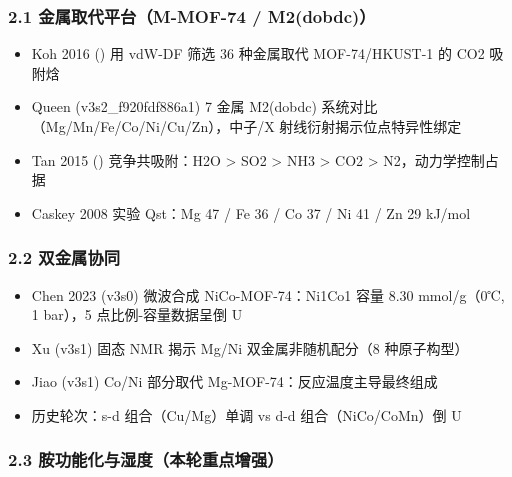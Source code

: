 \documentclass[12pt,a4paper]{ctexart}
\providecommand{\tightlist}{%
  \setlength{\itemsep}{0pt}\setlength{\parskip}{0pt}}
\begin{document}
\subsubsection{2.1 金属取代平台（M-MOF-74 / M2(dobdc)）}\label{ux91d1ux5c5eux53d6ux4ee3ux5e73ux53f0m-mof-74-m2dobdc}

\begin{itemize}
\tightlist
\item
  Koh 2016 (\cite{p26}) 用 vdW-DF 筛选 36 种金属取代 MOF-74/HKUST-1 的 CO2 吸附焓
\item
  Queen (v3s2\_f920fdf886a1) 7 金属 M2(dobdc) 系统对比（Mg/Mn/Fe/Co/Ni/Cu/Zn），中子/X 射线衍射揭示位点特异性绑定
\item
  Tan 2015 (\cite{p15}) 竞争共吸附：H2O \textgreater{} SO2 \textgreater{} NH3 \textgreater{} CO2 \textgreater{} N2，动力学控制占据
\item
  Caskey 2008 实验 Qst：Mg 47 / Fe 36 / Co 37 / Ni 41 / Zn 29 kJ/mol
\end{itemize}

\subsubsection{2.2 双金属协同}\label{ux53ccux91d1ux5c5eux534fux540c}

\begin{itemize}
\tightlist
\item
  Chen 2023 (v3s0) 微波合成 NiCo-MOF-74：Ni1Co1 容量 8.30 mmol/g（0℃, 1 bar），5 点比例-容量数据呈倒 U
\item
  Xu (v3s1) 固态 NMR 揭示 Mg/Ni 双金属非随机配分（8 种原子构型）
\item
  Jiao (v3s1) Co/Ni 部分取代 Mg-MOF-74：反应温度主导最终组成
\item
  历史轮次：s-d 组合（Cu/Mg）单调 vs d-d 组合（NiCo/CoMn）倒 U
\end{itemize}

\subsubsection{2.3 胺功能化与湿度（本轮重点增强）}\label{ux80faux529fux80fdux5316ux4e0eux6e7fux5ea6ux672cux8f6eux91cdux70b9ux589eux5f3a}
\end{document}
